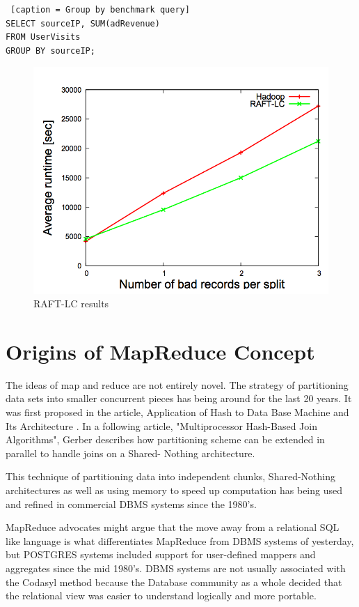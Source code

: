 \documentclass[10pt,twocolumn]{IEEEtran11}
\begin{document}
\begin{lstlisting} [caption = Group by benchmark query]
SELECT sourceIP, SUM(adRevenue)
FROM UserVisits
GROUP BY sourceIP;
\end{lstlisting}

\begin{figure}[h]
	\centering
	\includegraphics[scale=0.6]{images/raftBenchmark.png}
	\caption{ RAFT-LC results \protect\cite{quiane2011rafting}}
	\label{fig:raftPerformance}
\end{figure}

\section{Origins of MapReduce Concept}

The ideas of map and reduce are not entirely novel.  The strategy of partitioning  data sets into smaller concurrent pieces has being around for the last 20 years.  It was first proposed in the article, Application of Hash to Data Base Machine and Its Architecture \cite{kitsuregawa1983application}.   In a following article, "Multiprocessor Hash-Based Join Algorithms"\cite{dewitt1985multiprocessor}, Gerber describes how partitioning scheme can be extended in parallel to handle joins on a Shared- Nothing architecture. 
\par
This technique of partitioning data into independent chunks, Shared-Nothing architectures as well as using memory to speed up computation has being used and refined in commercial DBMS systems since the 1980's.
\par
MapReduce advocates might argue that the move away from a relational SQL like language is what differentiates MapReduce from DBMS systems of yesterday, but POSTGRES systems included support for user-defined  mappers and aggregates  since the mid 1980's.  DBMS systems are not usually associated with the Codasyl method because the Database community as a whole decided that the relational view was easier to understand logically and more portable.  









\end{document}
